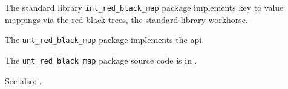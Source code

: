
The standard library {\tt int\_red\_black\_map} package implements key 
to value mappings via the red-black trees, the standard library workhorse.

The {\tt unt\_red\_black\_map} package implements the  api.

The {\tt unt\_red\_black\_map} package source code is in .

See also:  .




